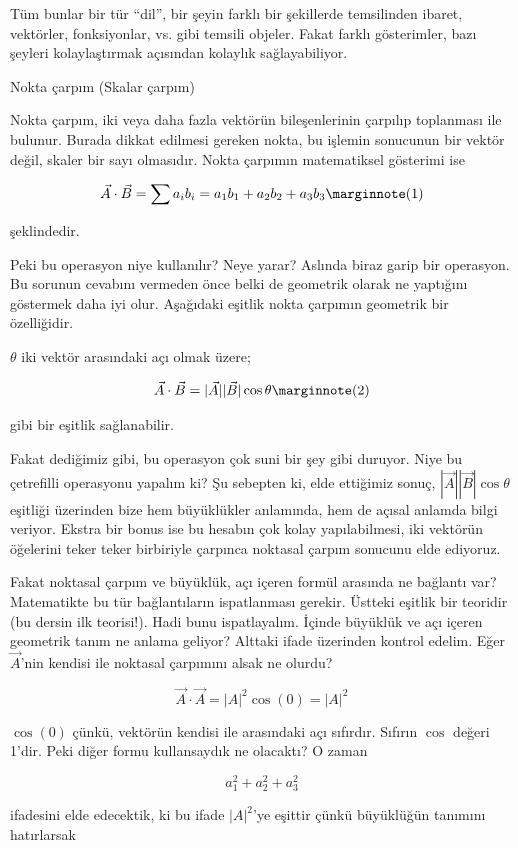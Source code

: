\documentclass[12pt,fleqn]{article}\usepackage{../../common}
\begin{document}
Tüm bunlar bir tür ``dil'', bir şeyin farklı bir şekillerde temsilinden
ibaret, vektörler, fonksiyonlar, vs. gibi temsili objeler. Fakat farklı 
gösterimler, bazı şeyleri kolaylaştırmak açısından kolaylık sağlayabiliyor.

Nokta çarpım (Skalar çarpım)

Nokta çarpım, iki veya daha fazla vektörün bileşenlerinin çarpılıp toplanması
ile bulunur. Burada dikkat edilmesi gereken nokta, bu işlemin sonucunun bir
vektör değil, skaler bir sayı olmasıdır. Nokta çarpımın matematiksel gösterimi
ise

$$
\vec{A} \cdot \vec{B} = \sum a_ib_i = a_1b_1 + a_2b_2 + a_3b_3 
\mlabel{1}
$$

şeklindedir.

Peki bu operasyon niye kullanılır? Neye yarar? Aslında biraz garip bir
operasyon. Bu sorunun cevabını vermeden önce belki de geometrik olarak ne
yaptığını göstermek daha iyi olur. Aşağıdaki eşitlik nokta çarpımın geometrik
bir özelliğidir.

$\theta$ iki vektör arasındaki açı olmak üzere;

$$
\vec{A} \cdot \vec{B} = |\vec{A}||\vec{B}| \cos \theta 
\mlabel{2}
$$

gibi bir eşitlik sağlanabilir.

Fakat dediğimiz gibi, bu operasyon çok suni bir şey gibi duruyor. Niye bu
çetrefilli operasyonu yapalım ki? Şu sebepten ki, elde ettiğimiz sonuç,
$|\vec{A}||\vec{B}| \cos \theta $ eşitliği üzerinden bize hem büyüklükler
anlamında, hem de açısal anlamda bilgi veriyor. Ekstra bir bonus ise bu hesabın
çok kolay yapılabilmesi, iki vektörün öğelerini teker teker birbiriyle çarpınca
noktasal çarpım sonucunu elde ediyoruz.

Fakat noktasal çarpım ve büyüklük, açı içeren formül arasında ne bağlantı var?
Matematikte bu tür bağlantıların ispatlanması gerekir. Üstteki eşitlik bir
teoridir (bu dersin ilk teorisi!). Hadi bunu ispatlayalım. İçinde büyüklük ve
açı içeren geometrik tanım ne anlama geliyor? Alttaki ifade üzerinden kontrol
edelim. Eğer $\vec{A}$'nin kendisi ile noktasal çarpımını alsak ne olurdu?

$$\vec{A} \cdot \vec{A} = |A|^2\cos(0) = |A|^2$$

$\cos(0)$ çünkü, vektörün kendisi ile arasındaki açı sıfırdır. Sıfırın $\cos$
değeri 1'dir. Peki diğer formu kullansaydık ne olacaktı? O zaman

$$ a_1^2 + a_2^2 + a_3^2 $$

ifadesini elde edecektik, ki bu ifade $|A|^2$'ye eşittir çünkü büyüklüğün
tanımını hatırlarsak
\end{document}
